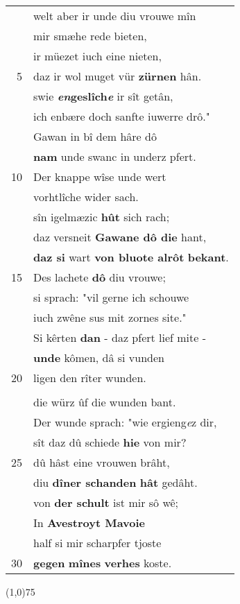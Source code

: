\documentclass[8pt,a4paper,notitlepage]{article}
\begin{document}
\begin{table}[ht]
\begin{minipage}[t]{0.5\linewidth}
\begin{tabular}{rl}
 & welt aber ir unde diu vrouwe mîn\\ 
 & mir smæhe rede bieten,\\ 
 & ir müezet iuch eine nieten,\\ 
5 & daz ir wol muget vür \textbf{zürnen} hân.\\ 
 & swie \textbf{\textit{en}geslîch\textit{e}} ir sît getân,\\ 
 & ich enbære doch sanfte iuwerre drô."\\ 
 & Gawan in bî dem hâre dô\\ 
 & \textbf{nam} unde swanc in underz pfert.\\ 
10 & Der knappe wîse unde wert\\ 
 & vorhtlîche wider sach.\\ 
 & sîn igelmæzic \textbf{hût} sich rach;\\ 
 & daz versneit \textbf{Gawane dô die} hant,\\ 
 & \textbf{daz si} wart \textbf{von bluote alrôt} \textbf{bekant}.\\ 
15 & Des lachete \textbf{dô} diu vrouwe;\\ 
 & si sprach: "vil gerne ich schouwe\\ 
 & iuch zwêne sus mit zornes site."\\ 
 & Si kêrten \textbf{dan} - daz pfert lief mite -\\ 
 & \textbf{unde} kômen, dâ si vunden\\ 
20 & ligen den rîter wunden.\\ 
 & \textit{\begin{large}M\end{large}}it triuwen Gawanes hant\\ 
 & die würz ûf die wunden bant.\\ 
 & Der wunde sprach: "wie ergieng\textit{e}z dir,\\ 
 & sît daz dû schiede \textbf{hie} von mir?\\ 
25 & dû hâst eine vrouwen brâht,\\ 
 & diu \textbf{dîner schanden} \textbf{hât} gedâht.\\ 
 & von \textbf{der schult} ist mir sô wê;\\ 
 & In \textbf{Avestroyt Mavoie}\\ 
 & half si mir scharpfer tjoste\\ 
30 & \textbf{gegen} \textbf{mînes} \textbf{verhes} koste.\\ 
\end{tabular}
\scriptsize
\line(1,0){75} \newline

\end{minipage}
\end{table}
\end{document}
